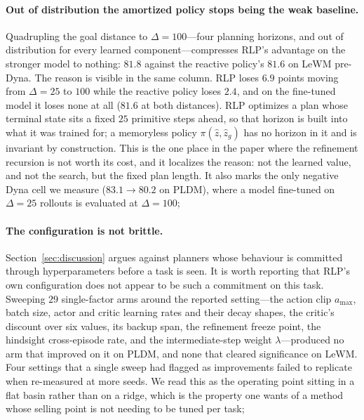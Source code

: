 \paragraph{Out of distribution the amortized policy stops being the weak
baseline.}
Quadrupling the goal distance to $\Delta = 100$---four planning horizons, and out
of distribution for every learned component---compresses RLP's advantage on the
stronger model to nothing: $81.8$ against the reactive policy's $81.6$ on LeWM
pre-Dyna. The reason is visible in the same column. RLP loses $6.9$ points
moving from $\Delta = 25$ to $100$ while the reactive policy loses $2.4$, and on
the fine-tuned model it loses none at all ($81.6$ at both distances). RLP
optimizes a plan whose terminal state sits a fixed $25$ primitive steps ahead, so
that horizon is built into what it was trained for; a memoryless policy
$\pi(\hat z, \hat z_g)$ has no horizon in it and is invariant by construction.
This is the one place in the paper where the refinement recursion is not worth
its cost, and it localizes the reason: not the learned value, and not the search,
but the fixed plan length. It also marks the only negative Dyna cell we measure
($83.1 \to 80.2$ on PLDM), where a model fine-tuned on $\Delta = 25$ rollouts is
evaluated at $\Delta = 100$; 

\paragraph{The configuration is not brittle.}
Section~\ref{sec:discussion} argues against planners whose behaviour is
committed through hyperparameters before a task is seen. It is worth reporting
that RLP's own configuration does not appear to be such a commitment on this
task. Sweeping $29$ single-factor arms around the reported setting---the action
clip $a_{\max}$, batch size, actor and critic learning rates and their decay
shapes, the critic's discount over six values, its backup span, the refinement
freeze point, the hindsight cross-episode rate, and the intermediate-step weight
$\lambda$---produced no arm that improved on it on PLDM, and none that cleared
significance on LeWM. Four settings that a single sweep had flagged as
improvements failed to replicate when re-measured at more seeds. We read this as
the operating point sitting in a flat basin rather than on a ridge, which is the
property one wants of a method whose selling point is not needing to be tuned per
task; 

